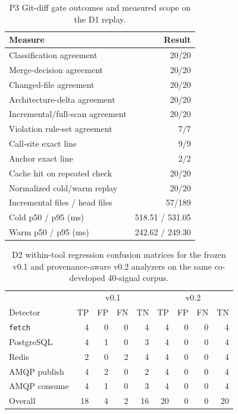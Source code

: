 \documentclass[conference]{IEEEtran}
\begin{document}
\begin{table}[t]
  \caption{P3 Git-diff gate outcomes and measured scope on the D1 replay.}
  \label{tab:phase3-results}
  \centering
  \small
  \begin{tabular}{lr}
    \hline
    Measure & Result \\
    \hline
    Classification agreement & 20/20 \\
    Merge-decision agreement & 20/20 \\
    Changed-file agreement & 20/20 \\
    Architecture-delta agreement & 20/20 \\
    Incremental/full-scan agreement & 20/20 \\
    Violation rule-set agreement & 7/7 \\
    Call-site exact line & 9/9 \\
    Anchor exact line & 2/2 \\
    Cache hit on repeated check & 20/20 \\
    Normalized cold/warm replay & 20/20 \\
    Incremental files / head files & 57/189 \\
    Cold p50 / p95 (ms) & 518.51 / 531.05 \\
    Warm p50 / p95 (ms) & 242.62 / 249.30 \\
    \hline
  \end{tabular}
\end{table}

\begin{table}[t]
  \caption{D2 within-tool regression confusion matrices for the frozen v0.1 and provenance-aware v0.2 analyzers on the same co-developed 40-signal corpus.}
  \label{tab:pattern-results}
  \centering
  \small
  \begin{tabular}{lrrrrrrrr}
    \hline
    & \multicolumn{4}{c}{v0.1} & \multicolumn{4}{c}{v0.2} \\
    Detector & TP & FP & FN & TN & TP & FP & FN & TN \\
    \hline
    \texttt{fetch} & 4 & 0 & 0 & 4 & 4 & 0 & 0 & 4 \\
    PostgreSQL & 4 & 1 & 0 & 3 & 4 & 0 & 0 & 4 \\
    Redis & 2 & 0 & 2 & 4 & 4 & 0 & 0 & 4 \\
    AMQP publish & 4 & 2 & 0 & 2 & 4 & 0 & 0 & 4 \\
    AMQP consume & 4 & 1 & 0 & 3 & 4 & 0 & 0 & 4 \\
    \hline
    Overall & 18 & 4 & 2 & 16 & 20 & 0 & 0 & 20 \\
    \hline
  \end{tabular}
\end{table}
\end{document}
